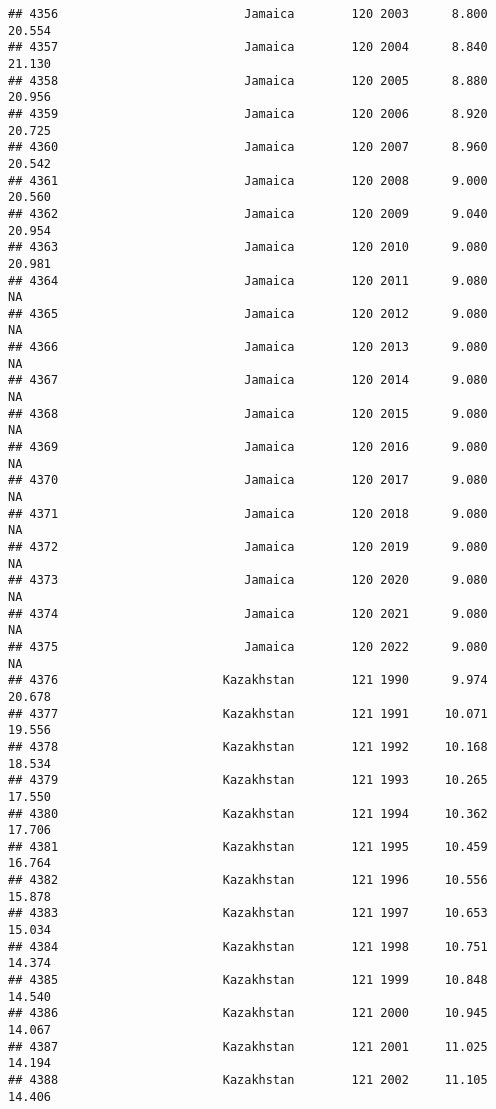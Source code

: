 \documentclass[
]{article}
\begin{document}
\begin{verbatim}
## 4356                          Jamaica        120 2003      8.800     20.554
## 4357                          Jamaica        120 2004      8.840     21.130
## 4358                          Jamaica        120 2005      8.880     20.956
## 4359                          Jamaica        120 2006      8.920     20.725
## 4360                          Jamaica        120 2007      8.960     20.542
## 4361                          Jamaica        120 2008      9.000     20.560
## 4362                          Jamaica        120 2009      9.040     20.954
## 4363                          Jamaica        120 2010      9.080     20.981
## 4364                          Jamaica        120 2011      9.080         NA
## 4365                          Jamaica        120 2012      9.080         NA
## 4366                          Jamaica        120 2013      9.080         NA
## 4367                          Jamaica        120 2014      9.080         NA
## 4368                          Jamaica        120 2015      9.080         NA
## 4369                          Jamaica        120 2016      9.080         NA
## 4370                          Jamaica        120 2017      9.080         NA
## 4371                          Jamaica        120 2018      9.080         NA
## 4372                          Jamaica        120 2019      9.080         NA
## 4373                          Jamaica        120 2020      9.080         NA
## 4374                          Jamaica        120 2021      9.080         NA
## 4375                          Jamaica        120 2022      9.080         NA
## 4376                       Kazakhstan        121 1990      9.974     20.678
## 4377                       Kazakhstan        121 1991     10.071     19.556
## 4378                       Kazakhstan        121 1992     10.168     18.534
## 4379                       Kazakhstan        121 1993     10.265     17.550
## 4380                       Kazakhstan        121 1994     10.362     17.706
## 4381                       Kazakhstan        121 1995     10.459     16.764
## 4382                       Kazakhstan        121 1996     10.556     15.878
## 4383                       Kazakhstan        121 1997     10.653     15.034
## 4384                       Kazakhstan        121 1998     10.751     14.374
## 4385                       Kazakhstan        121 1999     10.848     14.540
## 4386                       Kazakhstan        121 2000     10.945     14.067
## 4387                       Kazakhstan        121 2001     11.025     14.194
## 4388                       Kazakhstan        121 2002     11.105     14.406

\end{verbatim}
\end{document}
